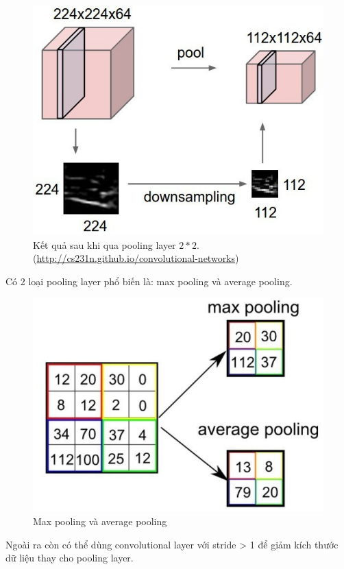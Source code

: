 \FloatBarrier
\begin{figure}[htp]
\begin{center}
\includegraphics[scale=0.5]{chap2/c2_figs/pooling.jpeg}
\end{center}
\caption{Kết quả sau khi qua pooling layer $2*2$. \\(\url{http://cs231n.github.io/convolutional-networks})}
\label{fig:pooling}
\end{figure}
\FloatBarrier

Có 2 loại pooling layer phổ biến là: max pooling và average pooling.
\FloatBarrier
\begin{figure}[htp]
\begin{center}
\includegraphics[scale=0.5]{chap2/c2_figs/10.jpg}
\end{center}
\caption{Max pooling và average pooling}
\label{fig:pooling}
\end{figure}
\FloatBarrier
Ngoài ra còn có thể dùng convolutional layer với stride > 1 để giảm kích thước dữ liệu thay cho pooling layer.

